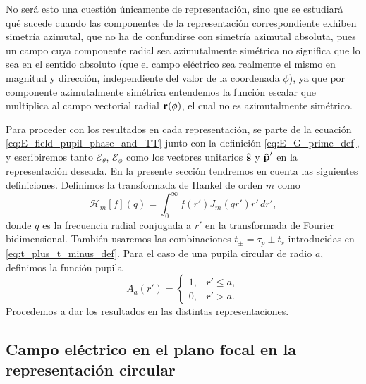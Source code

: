 No será esto una cuestión únicamente de representación, sino que se estudiará qué sucede cuando las componentes de la representación correspondiente exhiben simetría azimutal,
que no ha de confundirse con simetría azimutal absoluta, pues un campo cuya componente radial sea azimutalmente simétrica no significa que lo sea en el sentido absoluto (que el campo eléctrico sea realmente el mismo en magnitud y dirección, independiente del valor de la coordenada $\phi$), ya que por componente azimutalmente simétrica entendemos la función escalar que multiplica al campo vectorial radial $\vb r(\phi)$, el cual no es azimutalmente simétrico.

Para proceder con los resultados en cada representación, se parte de la ecuación \eqref{eq:E_field_pupil_phase_and_TT} junto con la definición \eqref{eq:E_G_prime_def}, y escribiremos tanto $\mathscr E_\theta$, $\mathscr E_\phi$ como los vectores unitarios $\bm{\hat{\mathbf{s}}}$  y $\bm{\hat{\mathbf{p}}}'$ en la representación deseada. En la presente sección tendremos en cuenta las siguientes definiciones. Definimos la transformada de Hankel de orden $m$ como
\begin{equation}
\mathscr H_m[f](q)
=
\int_0^\infty
f(r')J_m(qr')r'\,dr',
\label{eq:def_Hankel_Transform_m_order}
\end{equation}
donde $q$ es la frecuencia radial conjugada a $r'$ en la transformada de Fourier bidimensional. También usaremos las combinaciones $t_\pm = \tau_p \pm t_s$ introducidas en
\eqref{eq:t_plus_t_minus_def}. Para el caso de una pupila circular de radio $a$, definimos la función pupila
\begin{equation}
A_a(r')
=
\begin{cases}
1, & r' \leq a, \\
0, & r' > a.
\end{cases}
\label{eq:def_pupil_function}
\end{equation}
Procedemos a dar los resultados en las distintas representaciones.


\subsection{Campo eléctrico en el plano focal en la representación circular}


